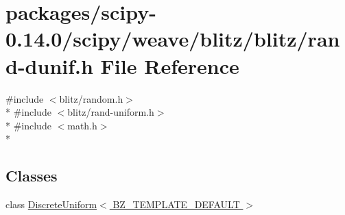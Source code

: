 \hypertarget{rand-dunif_8h}{}\section{packages/scipy-\/0.14.0/scipy/weave/blitz/blitz/rand-\/dunif.h File Reference}
\label{rand-dunif_8h}
{\ttfamily \#include $<$blitz/random.\+h$>$}\\*
{\ttfamily \#include $<$blitz/rand-\/uniform.\+h$>$}\\*
{\ttfamily \#include $<$math.\+h$>$}\\*
\subsection*{Classes}
\begin{DoxyCompactItemize}
\item 
class \hyperlink{classDiscreteUniform}{Discrete\+Uniform$<$ B\+Z\+\_\+\+T\+E\+M\+P\+L\+A\+T\+E\+\_\+\+D\+E\+F\+A\+U\+L\+T $>$}
\end{DoxyCompactItemize}
